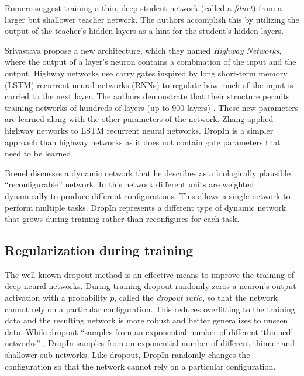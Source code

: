 \documentclass[10pt,twocolumn,letterpaper]{article}
\newcommand{\dropin}{DropIn }
\begin{document}
Romero \etal \cite{romero2014fitnets} suggest training a thin, deep student network (called a \textit{fitnet}) from a larger but shallower teacher network.  
The authors accomplish this by utilizing the output of the teacher's hidden layers as a hint for the student's hidden layers.

Srivastava \etal \cite{srivastava2015highway, srivastava2015training} propose a new architecture, which they named \textit{Highway Networks}, where the output of a layer's neuron contains a combination of the input and the output. 
Highway networks use carry gates inspired by long short-term memory (LSTM) recurrent neural networks (RNNs) to regulate how much of the input is carried to the next layer.  
The authors %
demonstrate that their structure permits training networks of hundreds of layers (up to 900 layers) \cite{srivastava2015highway, srivastava2015training}. 
These new parameters are learned along with the other parameters of the network.   
Zhang \etal \cite{Zhang2015highway} applied highway networks to LSTM recurrent neural networks.
\dropin is a simpler approach than highway networks as it does not contain gate parameters that need to be learned.

Breuel \cite{breuel2015possible} discusses a dynamic network that he describes as a biologically plausible ``reconfigurable'' network.
In this network different units are weighted dynamically to produce different configurations.  This allows a single network to perform multiple tasks.
\dropin represents a different type of dynamic network that grows during training rather than reconfigures for each task.

\subsection{Regularization during training}
The well-known dropout \cite{hinton2012improving, srivastava2014dropout} method is an effective means to improve the training  of deep neural networks.   
During training dropout randomly zeros a neuron's output activation with a probability $p$, called the \textit{dropout ratio},  so that the network cannot rely on a particular configuration.
This reduces overfitting to the training data and the resulting network is more robust and better generalizes to unseen data.  
While dropout ``samples from an exponential number of different `thinned' networks'' \cite{srivastava2014dropout}, \dropin samples from an exponential number of different thinner and shallower sub-networks.
Like dropout, \dropin randomly changes the configuration so that the network cannot rely on a particular configuration. 
\end{document}
